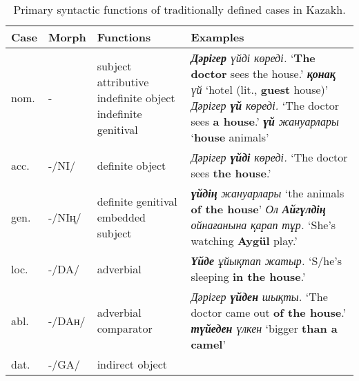 \documentclass[a4paper,11pt, onecolumn,twoside]{article}
\newcommand{\kazakh}[1]{{\em #1}}
\newcommand{\sgloss}[1]{\hspace{0.5em}`#1'}
\begin{document}
\begin{table}[htbp]
	\centering
	\caption{Primary syntactic functions of traditionally defined cases in Kazakh.}\label{tab:cases}
	\begin{small}
		\begin{tabular}{l l p{9em} p{28em}}
			\toprule
				\textbf{Case} & \textbf{Morph} & \textbf{Functions} & \textbf{Examples} \\
			\midrule
				nom. & - & subject\newline
										attributive\newline
										indefinite object\newline
										indefinite genitival 
									& \kazakh{\textbf{Дәрігер} үйді көреді.} \sgloss{\textbf{The doctor} sees the house.} \newline
										\kazakh{\textbf{қонақ} үй} \sgloss{hotel (lit., \textbf{guest} house)} \newline 
										\kazakh{Дәрігер \textbf{үй} көреді.} \sgloss{The doctor sees \textbf{a house}.}\newline
										\kazakh{\textbf{үй} жануарлары} \sgloss{\textbf{house} animals} \\\midrule
				acc. & -/NI/ & definite object %
										& \kazakh{Дәрігер \textbf{үйді} көреді.} \sgloss{The doctor sees \textbf{the house}.}
										\\\midrule
				gen. & -/NIң/ & definite genitival\newline
											embedded subject
										& \kazakh{\textbf{үйдің} жануарлары} \sgloss{the animals \textbf{of the house}} \newline
											\kazakh{Ол \textbf{Айгүлдің} ойнағанына қарап тұр.} \sgloss{She's watching \textbf{Aygül} play.} \\\midrule
				loc. & -/DA/ & adverbial
										& \kazakh{\textbf{Үйде} ұйықтап жатыр.} \sgloss{S/he's sleeping \textbf{in the house}.} \\\midrule
				abl. & -/DAн/ & adverbial\newline
											comparator 
										& \kazakh{Дәрігер \textbf{үйден} шықты.} \sgloss{The doctor came out \textbf{of the house}.}\newline
											\kazakh{\textbf{түйеден} үлкен} \sgloss{bigger \textbf{than a camel}}\\\midrule
				dat. & -/GA/ & indirect object\newline

\end{tabular}
\end{small}
\end{table}
\end{document}
